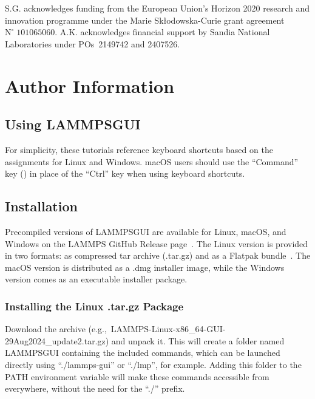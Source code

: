 \documentclass[9pt,tutorial]{livecoms}
\newcommand{\lammpsgui}{\textsf{LAMMPS\textendash GUI}}
\begin{document}
S.G. acknowledges funding from the European Union's Horizon 2020 research and
innovation programme under the Marie Skłodowska-Curie grant agreement $\text{N}^\circ\;101065060$.
A.K. acknowledges financial support by Sandia National Laboratories under
POs~2149742 and 2407526.

\section*{Author Information}
\makeorcid




\begin{appendices}
\section{Using \lammpsgui{}}
\label{using-lammps-gui-label}

\begin{note}
For simplicity, these tutorials reference keyboard shortcuts
based on the assignments for Linux and Windows.  {macOS} users should
use the ``Command'' key (\cmd) in place of the
``Ctrl'' key when using keyboard shortcuts.
\end{note}

\subsection{Installation}

Precompiled versions of \lammpsgui{} are available for Linux, {macOS},
and Windows on the LAMMPS GitHub Release
page~\cite{lammps_github_release}.  The Linux version is provided in two
formats: as compressed tar archive (.tar.gz) and as a Flatpak
bundle~\cite{flatpak_home}.  The {macOS} version is distributed as a
.dmg installer image, while the Windows version comes as an executable
installer package.

\subsubsection{Installing the Linux .tar.gz Package}

Download the archive (e.g.,~LAMMPS-Linux-x86\_64-GUI-29Aug2024\_update2.tar.gz)
and unpack it.  This will create a folder named \lammpsgui{} containing the
included commands, which can be launched directly using ``./lammps-gui'' or
``./lmp'', for example.  Adding this folder to the PATH environment
variable will make these commands accessible from everywhere, without the
need for the ``./'' prefix.


\end{appendices}
\end{document}
